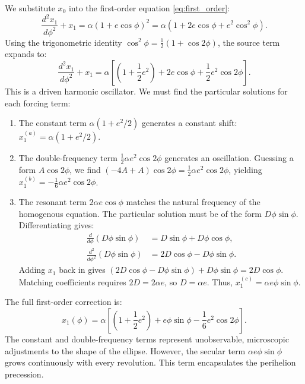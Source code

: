 \documentclass[11pt, a4paper]{report}
\begin{document}
We substitute $x_{0}$ into the first-order equation \eqref{eq:first_order}:
\begin{equation}
\frac{d^{2}x_{1}}{d\phi^{2}} + x_{1} = \alpha (1 + e \cos\phi)^{2} = \alpha (1 + 2e \cos\phi + e^{2} \cos^{2}\phi).
\end{equation}
Using the trigonometric identity $\cos^{2}\phi = \frac{1}{2}(1 + \cos 2\phi)$, the source term expands to:
\begin{equation}
\frac{d^{2}x_{1}}{d\phi^{2}} + x_{1} = \alpha \left[ \left(1 + \frac{1}{2}e^{2}\right) + 2e \cos\phi + \frac{1}{2}e^{2} \cos 2\phi \right].
\end{equation}
This is a driven harmonic oscillator. We must find the particular solutions for each forcing term:
\begin{enumerate}
    \item The constant term $\alpha(1 + e^{2}/2)$ generates a constant shift: $x_{1}^{(a)} = \alpha(1 + e^{2}/2)$.
    \item The double-frequency term $\frac{1}{2}\alpha e^{2}\cos 2\phi$ generates an oscillation. Guessing a form $A\cos 2\phi$, we find $(-4A + A)\cos 2\phi = \frac{1}{2}\alpha e^{2}\cos 2\phi$, yielding $x_{1}^{(b)} = -\frac{1}{6}\alpha e^{2}\cos 2\phi$.
    \item The resonant term $2\alpha e \cos\phi$ matches the natural frequency of the homogenous equation. The particular solution must be of the form $D\phi\sin\phi$. Differentiating gives:
    \begin{align}
    \frac{d}{d\phi}(D\phi\sin\phi) &= D\sin\phi + D\phi\cos\phi, \\
    \frac{d^{2}}{d\phi^{2}}(D\phi\sin\phi) &= 2D\cos\phi - D\phi\sin\phi.
    \end{align}
    Adding $x_{1}$ back in gives $(2D\cos\phi - D\phi\sin\phi) + D\phi\sin\phi = 2D\cos\phi$. Matching coefficients requires $2D = 2\alpha e$, so $D = \alpha e$. Thus, $x_{1}^{(c)} = \alpha e \phi\sin\phi$.
\end{enumerate}

The full first-order correction is:
\begin{equation}
x_{1}(\phi) = \alpha \left[ \left(1 + \frac{1}{2}e^{2}\right) + e\phi\sin\phi - \frac{1}{6}e^{2}\cos 2\phi \right].
\end{equation}
The constant and double-frequency terms represent unobservable, microscopic adjustments to the shape of the ellipse. However, the secular term $\alpha e \phi\sin\phi$ grows continuously with every revolution. This term encapsulates the perihelion precession.
\end{document}
